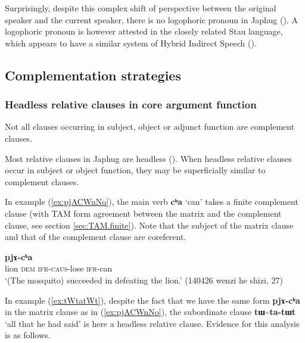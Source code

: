 \documentclass[oneside,a4paper,11pt]{article}
\newcommand{\ipa}[1]{\textbf{\phon#1}} %
\newcommand{\jpg}[2]{\ipa{#1} `#2'} %
\newcommand{\tld}{\textasciitilde{}}
\begin{document}
Surprisingly, despite this complex shift of perspective between the original speaker and the current speaker, there is no logophoric pronoun in Japhug (\citealt{hagege74logophoriques, nikitina12logophoric}). A logophoric pronoun is however attested in the closely related Stau language, which appears to have a similar system of Hybrid Indirect Speech (\citealt{jacques16stau}).


 \subsection{Complementation strategies}  
 
  \subsubsection{Headless relative clauses in core argument function}   \label{sec:relative}
Not all clauses occurring in subject, object or adjunct function are complement clauses. 

Most relative clauses in Japhug are headless  (\citealt{jacques16relatives}). When headless relative clauses occur in subject or object function, they may be superficially similar to complement clauses.

In example (\ref{ex:pjACWnNo}), the main verb \jpg{cʰa}{can} takes a finite complement clause (with TAM form agreement between the matrix and the complement clause, see section \ref{sec:TAM.finite}). Note that the subject of the matrix clause and that of the complement clause are coreferent.

\begin{exe}
\ex \label{ex:pjACWnNo}
\gll [\ipa{sɯŋgi} 	\ipa{nɯ} 	\ipa{pjɤ-ɕɯ-nŋo}] 	\ipa{pjɤ-cʰa} \\
lion \textsc{dem} \textsc{ifr-caus}-lose \textsc{ifr}-can \\
\glt `(The mosquito) succeeded in defeating the lion.' (140426 wenzi he shizi, 27)
\end{exe}

In example (\ref{ex:tWtatWt}), despite the fact that we have the same form \ipa{pjɤ-cʰa} in the matrix clause as in (\ref{ex:pjACWnNo}), the subordinate clause \ipa{tɯ\tld{}ta-tɯt} `all that he had said' is here a headless relative clause. Evidence for this analysis is as follows.
\end{document}
